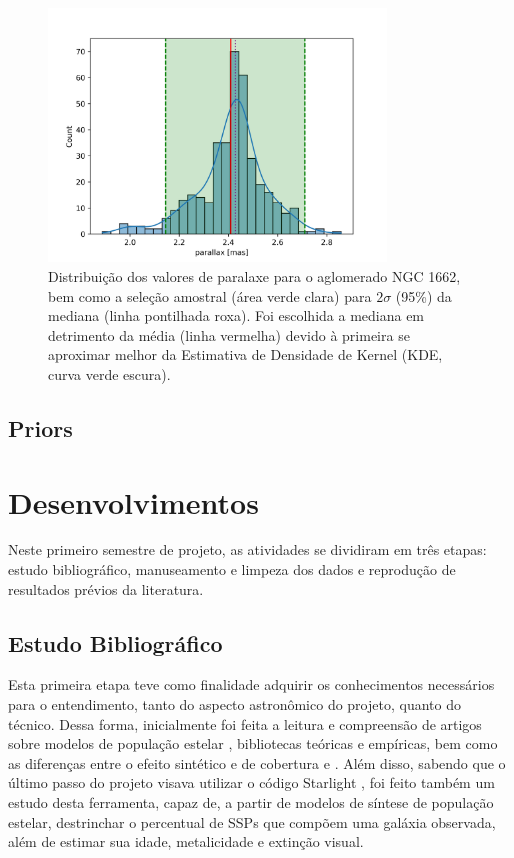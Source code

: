 \documentclass[12pt]{projeto}
\begin{document}
\begin{figure}[ht]
\centering
\includegraphics[width= 0.8\textwidth]{NGC1662_parallax.png}
\caption{\label{fig:selecao_amostral} Distribuição dos valores de paralaxe para o aglomerado NGC 1662, bem como a seleção amostral (área verde clara) para \(2\sigma\) (95\%) da mediana (linha pontilhada roxa). Foi escolhida a mediana em detrimento da média (linha vermelha) devido à primeira se aproximar melhor da Estimativa de Densidade de Kernel (KDE, curva verde escura).}
\end{figure}

\subsection{Priors}

\section{Desenvolvimentos}
Neste primeiro semestre de projeto, as atividades se dividiram em três etapas: estudo bibliográfico, manuseamento e limpeza dos dados e reprodução de resultados prévios da literatura.

\subsection{Estudo Bibliográfico}
Esta primeira etapa teve como finalidade adquirir os conhecimentos necessários para o entendimento, tanto do aspecto astronômico do projeto, quanto do técnico. Dessa forma, inicialmente foi feita a leitura e compreensão de artigos sobre modelos de população estelar \cite{BC03}, bibliotecas teóricas e empíricas, bem como as diferenças entre o efeito sintético e de cobertura \cite{Paula2014} e \cite{Paula2020}. Além disso, sabendo que o último passo do projeto visava utilizar o código Starlight \cite{starlight}, foi feito também um estudo desta ferramenta,
capaz de, a partir de modelos de síntese de população estelar, destrinchar o percentual de SSPs que compõem uma galáxia observada, além de estimar sua idade, metalicidade e extinção visual.
\end{document}
